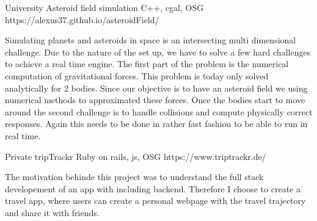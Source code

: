 

\begin{cventries}

  \cventry
    {University}
    {Asteroid field simulation} %
    {C++, cgal, OSG} %
    {https://alexus37.github.io/asteroidField/} %
    {
      \begin{cvitems} %
        \item {Simulating planets and asteroids in space is an intersecting multi dimensional challenge. Due to the nature of the set up, we have to solve a few hard challenges to achieve a real time engine. The first part of the problem is the numerical computation of gravitational forces. This problem is today only solved analytically for 2 bodies. Since our objective is to have an asteroid field we using numerical methods to approximated these forces. Once the bodies start to move around the second challenge is to handle collisions and compute physically correct responses. Again this needs to be done in rather fast fashion to be able to run in real time.}
      \end{cvitems}
    }

  \cventry
    {Private}
    {tripTrackr} %
    {Ruby on rails, js, OSG} %
    {https://www.triptrackr.de/} %
    {
      \begin{cvitems} %
        \item {
The motivation behinde this project was to understand the full stack developement of an app with including backend. Therefore I choose to create a travel app, where users can create a personal webpage with the travel trajectory and share it with friends.
        }
      \end{cvitems}
    }
    

\end{cventries}
